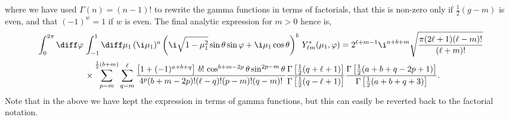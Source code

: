 where we have used \(\Gamma(n)=(n-1)!\) to rewrite the gamma functions in terms of factorials, that this is non-zero only if \(\frac{1}{2}(g-m)\) is even, and that \((-1)^{w}=1\) if \(w\) is even. The final analytic expression for \(m>0\) hence is,  
\begin{align}
\int_0^{2\pi}{\diff}\varphi\,& \int_{-1}^{1}{\diff}\mu_1\,(\i\mu_1)^a\left(\i\sqrt{1-\mu_1^2} \sin\theta \sin\varphi + \i\mu_1\cos\theta\right)^b \, Y^*_{\ell m} (\mu_1,\varphi)  = 2^{\ell+m-1}\i^{a+b+m}\sqrt{\frac{\pi(2\ell+1)(\ell-m)!}{(\ell+m)!}} \nonumber \\
&\times
\sum_{p=m}^{\frac{1}{2}(b+m)}\sum_{q=m}^{\ell}
\frac{\left[1+(-1)^{a+b+q}\right]\,b!\,\cos^{b+m-2p}\theta\sin^{2p-m}\theta}{4^p(b+m-2p)!(\ell-q)!(p-m)!(q-m)!}
\frac{\Gamma\left[\frac{1}{2}(q+\ell+1)\right]}{\Gamma\left[\frac{1}{2}(q-\ell+1)\right]}
\frac{\Gamma\left[\frac{1}{2}(a+b +q-2p+1)\right]}{\Gamma\left[\frac{1}{2}(a+b+q+3)\right]}.
\end{align}
Note that in the above we have kept the expression in terms of gamma functions, but this can easily be reverted back to the factorial notation.

\fi 
